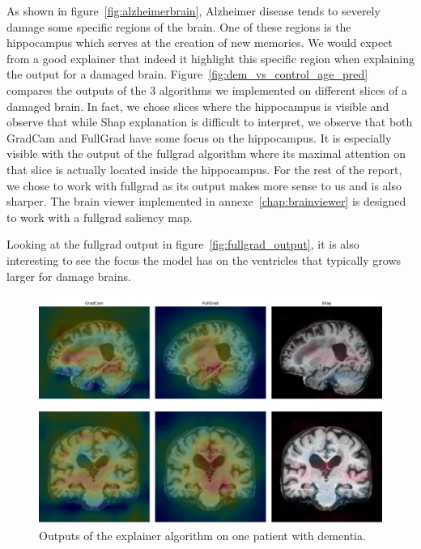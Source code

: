 As shown in figure~\ref{fig:alzheimerbrain}, Alzheimer disease tends to severely damage some specific regions of the brain. One of these regions is the hippocampus which serves at the creation of new memories. We would expect from a good explainer that indeed it highlight this specific region when explaining the output for a damaged brain. Figure~\ref{fig:dem_vs_control_age_pred} compares the outputs of the 3 algorithms we implemented on different slices of a damaged brain. In fact, we chose slices where the hippocampus is visible and observe that while Shap explanation is difficult to interpret, we observe that both GradCam and FullGrad have some focus on the hippocampus. It is especially visible with the output of the fullgrad algorithm where its maximal attention on that slice is actually located inside the hippocampus. For the rest of the report, we chose to work with fullgrad as its output makes more sense to us and is also sharper. The brain viewer implemented in annexe~\ref{chap:brainviewer} is designed to work with a fullgrad saliency map.

Looking at the fullgrad output in figure~\ref{fig:fullgrad_output}, it is also interesting to see the focus the model has on the ventricles that typically grows larger for damage brains. 



\begin{figure}
    \centering
    \includegraphics[width=0.9\linewidth]{figures/Experiements/explainer_coparaison.pdf}
    \caption{Outputs of the explainer algorithm on one patient with dementia.}
    \label{fig:explainer_compared}
\end{figure}

